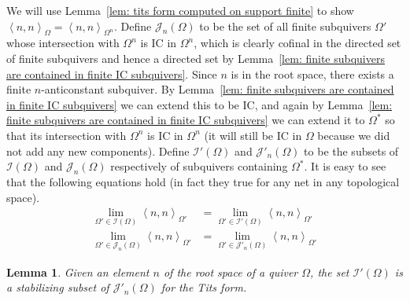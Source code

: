 \documentclass{article}
\newcommand{\bracket}[1]{\left \langle #1 \right\rangle}
\newtheorem{lemma}{Lemma}[section]
\begin{document}
We will use Lemma~\ref{lem: tits form computed on support finite} to show $\bracket{n , n}_\Omega = \bracket{n , n}_{\Omega^n}$. Define $\mathcal{J}_n(\Omega)$ to be the set of all finite subquivers $\Omega'$ whose intersection with $\Omega^n$ is IC in $\Omega^n$, which is clearly cofinal in the directed set of finite subquivers and hence a directed set by Lemma~\ref{lem: finite subquivers are contained in finite IC subquivers}.  Since $n$ is in the root space, there exists a finite $n$-anticonstant subquiver.  By Lemma~\ref{lem: finite subquivers are contained in finite IC subquivers} we can extend this to be IC, and again by Lemma~\ref{lem: finite subquivers are contained in finite IC subquivers} we can extend it to $\Omega^*$ so that its intersection with $\Omega^n$ is IC in $\Omega^n$ (it will still be IC in $\Omega$ because we did not add any new components). Define $\mathcal{I}'(\Omega)$ and $\mathcal{J}'_n(\Omega)$ to be the subsets of $\mathcal{I}(\Omega)$ and $\mathcal{J}_n(\Omega)$ respectively of subquivers containing $\Omega^*$. It is easy to see that the following equations hold (in fact they true for any net in any topological space).  
\begin{align}
  \label{eq:intial-segment}
   \lim_{\Omega' \in \mathcal{I}(\Omega)} \bracket{n,n}_{\Omega'}&= \lim_{\Omega' \in \mathcal{I}'(\Omega)} \bracket{n,n}_{\Omega'}\\
   \lim_{\Omega' \in \mathcal{J}_n(\Omega)} \bracket{n,n}_{\Omega'}&= \lim_{\Omega' \in \mathcal{J}'_n(\Omega)} \bracket{n,n}_{\Omega'} \nonumber
\end{align}



\begin{lemma}\label{lem: stabilizing subset}
  Given an element $n$ of the root space of a quiver $\Omega$, the set $\mathcal{I}'(\Omega)$ is a stabilizing subset of $\mathcal{J}'_n(\Omega)$ for the Tits form.
\end{lemma}
\end{document}
